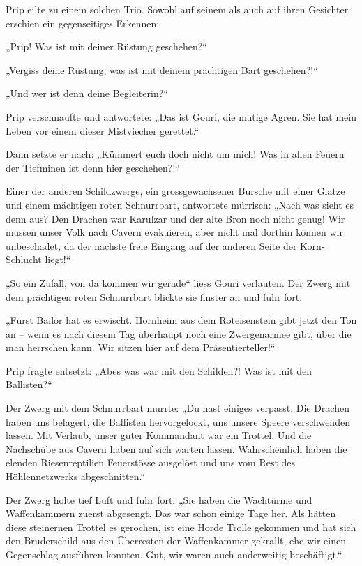 \documentclass[10pt, a4paper, oneside]{book}
\begin{document}
Prip eilte zu einem solchen Trio. Sowohl auf seinem als auch auf ihren Gesichter erschien ein gegenseitiges Erkennen:

„Prip! Was ist mit deiner Rüstung geschehen?“

„Vergiss deine Rüstung, was ist mit deinem prächtigen Bart geschehen?!“

„Und wer ist denn deine Begleiterin?“

Prip verschnaufte und antwortete: „Das ist Gouri, die mutige Agren. Sie hat mein Leben vor einem dieser Mistviecher gerettet.“

Dann setzte er nach: „Kümmert euch doch nicht um mich! Was in allen Feuern der Tiefminen ist denn hier geschehen?!“

Einer der anderen Schildzwerge, ein grossgewachsener Bursche mit einer Glatze und einem mächtigen roten Schnurrbart, antwortete mürrisch: „Nach was sieht es denn aus? Den Drachen war Karulzar und der alte Bron noch nicht genug! Wir müssen unser Volk nach Cavern evakuieren, aber nicht mal dorthin können wir unbeschadet, da der nächste freie Eingang auf der anderen Seite der Korn-Schlucht liegt!“

„So ein Zufall, von da kommen wir gerade“ liess Gouri verlauten. Der Zwerg mit dem prächtigen roten Schnurrbart blickte sie finster an und fuhr fort:

„Fürst Bailor hat es erwischt. Hornheim aus dem Roteisenstein gibt jetzt den Ton an – wenn es nach diesem Tag überhaupt noch eine Zwergenarmee gibt, über die man herrschen kann. Wir sitzen hier auf dem Präsentierteller!“

Prip fragte entsetzt: „Abes was war mit den Schilden?! Was ist mit den Ballisten?“

Der Zwerg mit dem Schnurrbart murrte: „Du hast einiges verpasst. Die Drachen haben uns belagert, die Ballisten hervorgelockt, uns unsere Speere verschwenden lassen. Mit Verlaub, unser guter Kommandant war ein Trottel. Und die Nachschübe aus Cavern haben auf sich warten lassen. Wahrscheinlich haben die elenden Riesenreptilien Feuerstösse ausgelöst und uns vom Rest des Höhlennetzwerks abgeschnitten.“

Der Zwerg holte tief Luft und fuhr fort: „Sie haben die Wachtürme und Waffenkammern zuerst abgesengt. Das war schon einige Tage her. Als hätten diese steinernen Trottel es gerochen, ist eine Horde Trolle gekommen und hat sich den Bruderschild aus den Überresten der Waffenkammer gekrallt, ehe wir einen Gegenschlag ausführen konnten. Gut, wir waren auch anderweitig beschäftigt.“
\end{document}
